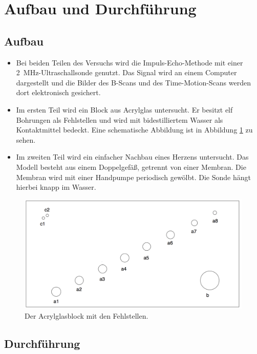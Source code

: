 \section{Aufbau und Durchführung}
\label{sec:Durchführung}

\subsection{Aufbau}

\begin{itemize}
  \item Bei beiden Teilen des Versuchs wird die Impuls-Echo-Methode mit einer
    \SI{2}{\mega\hertz}-Ultraschallsonde genutzt. Das Signal wird an einem Computer dargestellt und
    die Bilder des B-Scans und des Time-Motion-Scans werden dort elektronisch
    gesichert.
  \item Im ersten Teil wird ein Block aus Acrylglas untersucht. Er besitzt
    elf Bohrungen als Fehlstellen und wird mit bidestilliertem Wasser als
    Kontaktmittel bedeckt. Eine schematische Abbildung ist in Abbildung
    \ref{fig:acrylblock} zu sehen.
  \item Im zweiten Teil wird ein einfacher Nachbau eines Herzens untersucht.
    Das Modell besteht aus einem Doppelgefäß, getrennt von einer Membran. Die
    Membran wird mit einer Handpumpe periodisch gewölbt. Die Sonde hängt hierbei
    knapp im Wasser.
\end{itemize}

\begin{figure}
  \centering
  \includegraphics[width=\textwidth]{Pics/blockneu.pdf}
  \caption{Der Acrylglasblock mit den Fehlstellen.\cite{anleitung}}
  \label{fig:acrylblock}
\end{figure}

\subsection{Durchführung}

